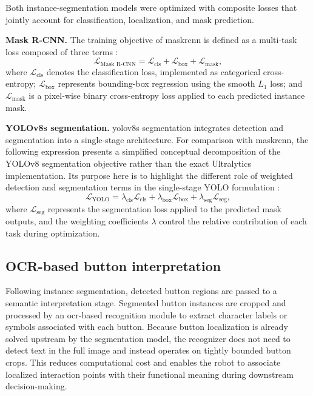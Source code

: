 Both instance-segmentation models were optimized with composite losses that
jointly account for classification, localization, and mask prediction.


\noindent\textbf{Mask R-CNN.}
The training objective of \gls{maskrcnn} is defined as a multi-task loss composed of
three terms \citep{he2017maskrcnn}:
\begin{equation}
\mathcal{L}_{\text{Mask R-CNN}} =
\mathcal{L}_{\text{cls}} +
\mathcal{L}_{\text{box}} +
\mathcal{L}_{\text{mask}},
\end{equation}
where $\mathcal{L}_{\text{cls}}$ denotes the classification loss, implemented as
categorical cross-entropy; $\mathcal{L}_{\text{box}}$ represents bounding-box
regression using the smooth $L_1$ loss; and $\mathcal{L}_{\text{mask}}$ is a
pixel-wise binary cross-entropy loss applied to each predicted instance mask.


\noindent\textbf{YOLOv8s segmentation.}
\gls{yolo}v8s segmentation integrates detection and segmentation into a single-stage architecture.
For comparison with \gls{maskrcnn}, the following expression presents a
simplified conceptual decomposition of the YOLOv8 segmentation objective rather
than the exact Ultralytics implementation. Its purpose here is to highlight the
different role of weighted detection and segmentation terms in the single-stage
YOLO formulation \citep{jocher2023yolov8}:
\begin{equation}
\mathcal{L}_{\text{YOLO}} =
\lambda_{\text{cls}} \mathcal{L}_{\text{cls}} +
\lambda_{\text{box}} \mathcal{L}_{\text{box}} +
\lambda_{\text{seg}} \mathcal{L}_{\text{seg}},
\end{equation}
where $\mathcal{L}_{\text{seg}}$ represents the segmentation loss applied to the
predicted mask outputs, and the weighting coefficients $\lambda$ control the
relative contribution of each task during optimization.


\subsection{OCR-based button interpretation}

Following instance segmentation, detected button regions are passed to a
semantic interpretation stage. Segmented button instances are cropped and processed by
an \gls{ocr}-based recognition module to extract character labels or symbols associated with each button. 
Because button localization is already solved upstream by
the segmentation model, the recognizer does not need to detect text in the full image and instead operates on tightly
bounded button crops. This reduces computational cost and enables the robot to
associate localized interaction points with their functional meaning during
downstream decision-making.


